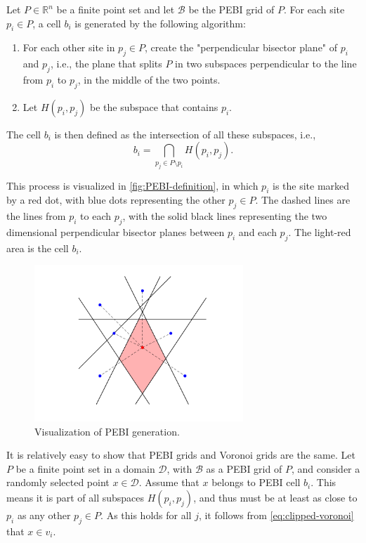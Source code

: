 \begin{definition}
\label{def:PEBI-grid}
Let $P\in \mathbb{R}^n$ be a finite point set and let $\mathcal{B}$ be the PEBI grid of $P$. For each site $p_i \in P$, a cell $b_i$ is generated by the following algorithm:
\begin{enumerate}
    \item For each other site in $p_j \in P$, create the "perpendicular bisector plane" of $p_i$ and $p_j$, i.e., the plane that splits $P$ in two subspaces perpendicular to the line from $p_i$ to $p_j$, in the middle of the two points.
    \item Let $H(p_i, p_j)$ be the subspace that contains $p_i$.
\end{enumerate}
The cell $b_i$ is then defined as the intersection of all these subspaces, i.e.,
\begin{equation}
    b_i = \bigcap_{p_j \in P \setminus p_i} H(p_i, p_j).
\end{equation}
\end{definition}

This process is visualized in \autoref{fig:PEBI-definition}, in which $p_i$ is the site marked by a red dot, with blue dots representing the other $p_j \in P$. The dashed lines are the lines from $p_i$ to each $p_j$, with the solid black lines representing the two dimensional perpendicular bisector planes between $p_i$ and each $p_j$. The light-red area is the cell $b_i$.

\begin{figure}[ht]
    \centering
    \includegraphics[width=0.7\textwidth]{report/Images/Theory/PEBI_definition.png}
    \caption{Visualization of PEBI generation.}
    \label{fig:PEBI-definition}
\end{figure}

It is relatively easy to show that PEBI grids and Voronoi grids are the same. Let $P$ be a finite point set in a domain $\mathcal{D}$, with $\mathcal{B}$ as a PEBI grid of $P$, and consider a randomly selected point $x \in \mathcal{D}$. Assume that $x$ belongs to PEBI cell $b_i$. This means it is part of all subspaces $H(p_i, p_j)$, and thus must be at least as close to $p_i$ as any other $p_j \in P$. As this holds for all $j$, it follows from \autoref{eq:clipped-voronoi} that $x \in v_i$.

